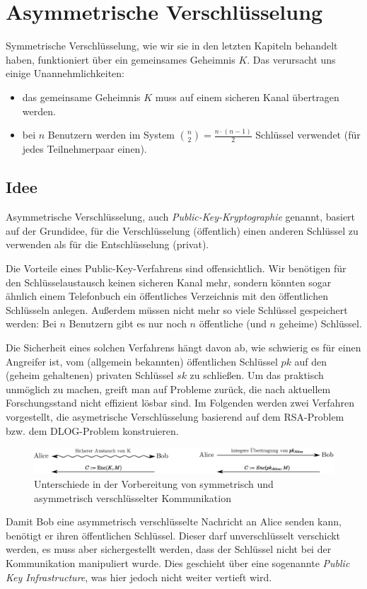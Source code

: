 \chapter{Asymmetrische Verschlüsselung}
\label{ch:asymmenc}

Symmetrische Verschlüsselung, wie wir sie in den letzten Kapiteln
behandelt haben, funktioniert über ein gemeinsames Geheimnis $K$.  Das
verursacht uns einige Unannehmlichkeiten:

\begin{itemize}
\item das gemeinsame Geheimnis $K$ muss auf einem sicheren Kanal
  übertragen werden.
\item bei $n$ Benutzern werden im System $\binom{n}{2} = \frac{n \cdot
    (n-1)}{2}$ Schlüssel verwendet (für jedes Teilnehmerpaar einen).
\end{itemize}

\section{Idee} Asymmetrische Verschlüsselung\indexEncryptionAsymm, auch
\emph{Public-Key-Kryptographie} genannt, basiert auf der Grundidee, für
die Verschlüsselung (öffentlich) einen anderen Schlüssel zu verwenden
als für die Entschlüsselung (privat).

Die Vorteile eines Public-Key-Verfahrens sind offensichtlich. Wir
benötigen für den Schlüsselaustausch keinen sicheren Kanal mehr, sondern
könnten sogar ähnlich einem Telefonbuch ein öffentliches Verzeichnis mit
den öffentlichen Schlüsseln anlegen. Außerdem müssen nicht mehr so viele
Schlüssel gespeichert werden: Bei $n$ Benutzern gibt es nur noch $n$
öffentliche (und $n$ geheime) Schlüssel.

Die Sicherheit eines solchen Verfahrens hängt davon ab, wie schwierig es
für einen Angreifer ist, vom (allgemein bekannten) öffentlichen
Schlüssel $pk$ auf den (geheim gehaltenen) privaten Schlüssel $sk$ zu
schließen. Um das praktisch unmöglich zu machen, greift man auf Probleme
zurück, die nach aktuellem Forschungsstand nicht effizient lösbar
sind. Im Folgenden werden zwei Verfahren vorgestellt, die asymetrische
Verschlüsselung basierend auf dem RSA-Problem bzw. dem DLOG-Problem
konstruieren.

\begin{figure}
  \includegraphics[width=\textwidth]{images/vergleich-symmetrisch-asymmetrisch.eps}
  \caption{Unterschiede in der Vorbereitung von symmetrisch und
    asymmetrisch verschlüsselter Kommunikation}
  \label{fig:asymmenc-symmenc}
\end{figure} Damit Bob eine asymmetrisch verschlüsselte Nachricht an
Alice senden kann, benötigt er ihren öffentlichen Schlüssel. Dieser darf
unverschlüsselt verschickt werden, es muss aber sichergestellt werden,
dass der Schlüssel nicht bei der Kommunikation manipuliert wurde. Dies
geschieht über eine sogenannte \textit{Public Key Infrastructure}, was
hier jedoch nicht weiter vertieft wird.
